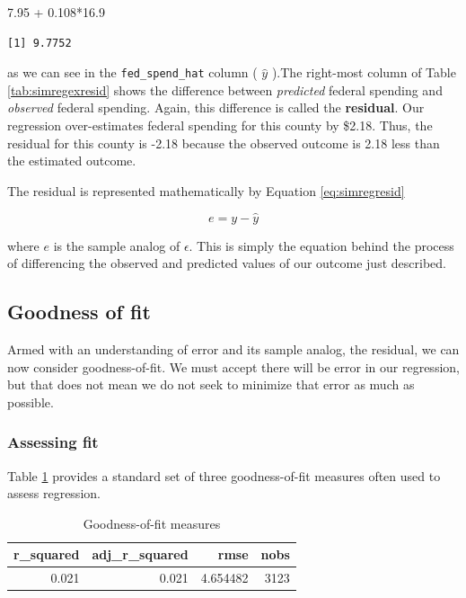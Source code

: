 \documentclass[
]{book}
\makeatletter
\newenvironment{Shaded}{\begin{snugshade}}{\end{snugshade}}
\newcommand{\FloatTok}[1]{\textcolor[rgb]{0.06,0.06,0.06}{#1}}
\newcommand{\SpecialCharTok}[1]{\textcolor[rgb]{0,0,0}{#1}}
\newenvironment{kframe}{%
\medskip{}
\setlength{\fboxsep}{.8em}
 \def\at@end@of@kframe{}%
 \ifinner\ifhmode%
  \def\at@end@of@kframe{\end{minipage}}%
  \begin{minipage}{\columnwidth}%
 \fi\fi%
 \def\FrameCommand##1{\hskip\@totalleftmargin \hskip-\fboxsep
 \colorbox{shadecolor}{##1}\hskip-\fboxsep
     \hskip-\linewidth \hskip-\@totalleftmargin \hskip\columnwidth}%
 \MakeFramed {\advance\hsize-\width
   \@totalleftmargin\z@ \linewidth\hsize
   \@setminipage}}%
 {\par\unskip\endMakeFramed%
 \at@end@of@kframe}
\renewenvironment{Shaded}{\begin{kframe}}{\end{kframe}}
\makeatother
\begin{document}
\begin{Shaded}
\begin{Highlighting}[]
\FloatTok{7.95} \SpecialCharTok{+} \FloatTok{0.108}\SpecialCharTok{*}\FloatTok{16.9}
\end{Highlighting}
\end{Shaded}

\begin{verbatim}
[1] 9.7752
\end{verbatim}

as we can see in the \texttt{fed\_spend\_hat} column ( \(\hat{y}\) ).The right-most column of Table \ref{tab:simregexresid} shows the difference between \emph{predicted} federal spending and \emph{observed} federal spending. Again, this difference is called the \textbf{residual}. Our regression over-estimates federal spending for this county by \$2.18. Thus, the residual for this county is -2.18 because the observed outcome is 2.18 less than the estimated outcome.

The residual is represented mathematically by Equation \eqref{eq:simregresid}

\begin{equation}
e = y - \hat{y}
\label{eq:simregresid}
\end{equation}

where \(e\) is the sample analog of \(\epsilon\). This is simply the equation behind the process of differencing the observed and predicted values of our outcome just described.

\hypertarget{goodness-of-fit}{%
\subsection{Goodness of fit}\label{goodness-of-fit}}

Armed with an understanding of error and its sample analog, the residual, we can now consider goodness-of-fit. We must accept there will be error in our regression, but that does not mean we do not seek to minimize that error as much as possible.

\hypertarget{assessing-fit}{%
\subsubsection*{Assessing fit}\label{assessing-fit}}


Table \ref{tab:simregexfit} provides a standard set of three goodness-of-fit measures often used to assess regression.

\begin{table}

\caption{\label{tab:simregexfit}Goodness-of-fit measures}
\centering
\begin{tabular}[t]{r|r|r|r}
\hline
r\_squared & adj\_r\_squared & rmse & nobs\\
\hline
0.021 & 0.021 & 4.654482 & 3123\\
\hline
\end{tabular}
\end{table}
\end{document}
